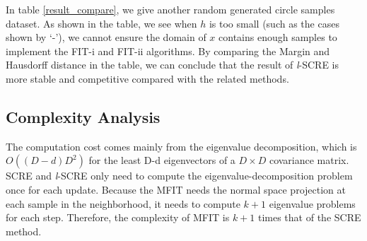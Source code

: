 \documentclass[aos,preprint]{imsart}
\theoremstyle{remark}
\begin{document}
\begin{appendix}
\begin{table}[h]
\caption{The Margin and Hausdorff between $\cal \hat{G}$, ${\cal \hat{G}}_{\ell}$ and $\mathcal M$ Varies with $h$ for SCRE and {\it l}-SCRE}
\end{table}
In table \eqref{result_compare}, we give another random generated circle samples dataset. As shown in the table, we see when $h$ is too small (such as the cases shown by `-'), we cannot ensure the domain of $x$ contains enough samples to implement the FIT-i and FIT-ii algorithms. By comparing the Margin and Hausdorff distance in the table, we can conclude that the result of {\it l}-SCRE is more stable and competitive compared with the related methods.
\subsection{Complexity Analysis}
The computation cost comes mainly from the eigenvalue decomposition, which is $O((D-d)D^2)$ for the least D-d eigenvectors of a $D\times D$ covariance matrix. SCRE and {\it l}-SCRE only need to compute the eigenvalue-decomposition problem once for each update. Because the MFIT needs the normal space projection at each sample in the neighborhood, it needs to compute $k+1$ eigenvalue problems for each step. Therefore, the complexity of MFIT is $k+1$ times that of the SCRE method.
\end{appendix}
\end{document}
